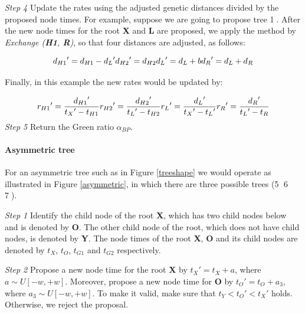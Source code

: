 \documentclass{bmcart}
\begin{document}
\emph{Step 4}  Update the rates using the adjusted genetic distances divided by the proposed node times. For example, suppose we are going to propose tree \textcircled1. After the new node times for the root \textbf{X} and \textbf{L} are proposed, we apply the method by \textit{Exchange (\textbf{H1}, \textbf{R})}, so that four distances are adjusted, as follows:

\begin{equation}\label{example1.1}
{d_{H1}}' = {d_{H1}} - {d_L}'  \\
{d_{H2}}' = {d_{H2}} \\
{d_L}' = {d_L} + b \\
{d_R}' = {d_L} + {d_R}
\end{equation}

Finally, in this example the new rates would be updated by:

\begin{equation}\label{example1.2}
{r_{H1}}' = \frac{{{d_{H1}}'}}{{{t_X}' - {t_{H1}}}} \\
{r_{H2}}' = \frac{{{d_{H2}}'}}{{{t_L}' - {t_{H2}}}} \\
{r_L}' = \frac{{{d_L}'}}{{{t_X}' - {t_L}'}} \\
{r_R}' = \frac{{{d_R}'}}{{{t_L}' - {t_R}}}
\end{equation}
\emph{Step 5} Return the Green ratio ${\alpha_{BP}}$.
\paragraph*{Asymmetric tree}

For an asymmetric tree such as in Figure \ref{treeshape} we would operate as illustrated in Figure \ref{asymmetric}, in which there are three possible trees (\textcircled5 \textcircled6 \textcircled7).

\emph{Step 1} Identify the child node of the root \textbf{X}, which has two child nodes below and is denoted by \textbf{O}. The other child node of the root, which does not have child nodes, is denoted by \textbf{Y}. The node times of the root \textbf{X},  \textbf{O} and its child nodes are denoted by ${t_X}$, ${t_O}$, ${t_{G1}}$ and ${t_{G2}}$ respectively.

\emph{Step 2} Propose a new node time for the root \textbf{X} by ${t_X}' = {t_X} + a$, where $a \sim U[ - w, + w]$. Moreover, propose a new node time for \textbf{O} by ${t_O}' = {t_O} + {a_3}$, where ${a_3} \sim U[ - w, + w]$. To make it valid, make sure that ${t_Y} < {t_O}' < {t_X}'$ holds. Otherwise, we reject the proposal.
\end{document}
